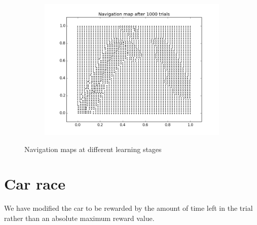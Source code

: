 \begin{figure}[h!]
\begin{subfigure}[b]{0.6\textwidth}
    \includegraphics[width=\textwidth]{figures/nmap_1000.png}
\end{subfigure}
\caption{\label{fig:navmap}Navigation maps at different learning stages}
\end{figure}   


%
%
%
%

\section{Car race}
We have modified the car to be rewarded by the amount of time left in the trial rather than an absolute maximum reward value. 
